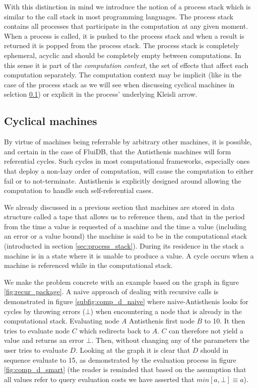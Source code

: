 With this distinction in mind we introduce the notion of a process
stack which is similar to the call stack in most programming
languages. The process stack contains all processes that participate
in the computation at any given moment. When a process is called, it
is pushed to the process stack and when a result is returned it is
popped from the process stack. The process stack is completely
ephemeral, acyclic and should be completely empty between
computations. In this sense it is part of the \emph{computation
  context}, the set of effects that affect each computation
separately. The computation context may be implicit (like in the case
of the process stack as we will see when discussing cyclical machines
in selction \ref{sec:cyclical_machines}) or explicit in the process'
underlying Kleisli arrow.

\subsection{Cyclical machines}
\label{sec:cyclical_machines}

By virtue of machines being referrable by arbitrary other machines, it
is possible, and certain in the case of FluiDB, that the Antisthenis
machines will form referential cycles. Such cycles in most
computational frameworks, especially ones that deploy a non-lazy order
of computation, will cause the computation to either fail or to
not-terminate. Antisthenis is explicitly designed around allowing the
computation to handle such self-referential cases.

We already discussed in a previous section that machines are stored in
data structure called a tape that allows us to reference them, and
that in the period from the time a value is requested of a machine and
the time a value (including an error or a value bound) the machine is
said to be in the computational stack (introducted in section
\ref{sec:process_stack}). During its residence in the stack a machine is
in a state where it is unable to produce a value. A cycle occurs when
a machine is referenced while in the computational stack.

We make the problem concrete with an example based on the graph in
figure \ref{fig:recur_package}. A naive approach of dealing with
recursive calls is demonstrated in figure \ref{subfig:comp_d_naive} where
naive-Antisthenis looks for cycles by throwing errors (\(\bot\)) when
encountering a node that is already in the computational
stack. Evaluating node \(A\) Antisthenis first node \(B\) to 10. It
then tries to evaluate node \(C\) which redirects back to \(A\). \(C\)
can therefore not yield a value and returns an error \(\bot\). Then,
without changing any of the parameters the user tries to evaluate
\(D\). Looking at the graph it is clear that \(D\) should in sequence
evaluate to 15, as demonstrated by the evaluation process in figure
\ref{fig:comp_d_smart} (the reader is reminded that based on the assumption
that all values refer to query evaluation costs we have asserted that
\(min[a,\bot] \equiv a\)).


